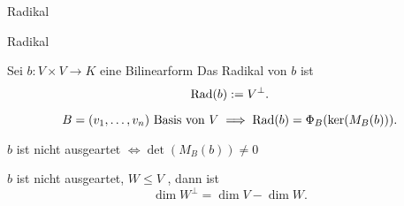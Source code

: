 \documentclass[class=article, crop=false]{standalone}
\begin{document}
\begin{zettel}{Radikal}

\begin{flashcard}[440yjl7c]{Radikal}
	\begin{definition}[Radikal]
		Sei $b: V \times V \to  K$ eine Bilinearform Das Radikal von $b$ ist
		\[
			\operatorname{Rad}(b) := V^\perp
		.\]
	\end{definition}
\end{flashcard}

\begin{theorem}
	\[
		B = ( v_1,\dots,v_n) \text{ Basis von } V \implies \operatorname{Rad}(b)= \Phi_{B} ( \ker(M_B (b)))
	.\]
\end{theorem}
\begin{corollary}
	$b$ ist nicht ausgeartet $\iff \det (M_B(b) ) \neq 0$
\end{corollary}
\begin{theorem}
	$b$ ist nicht ausgeartet, $W \leq V$ , dann ist
	\[
		\dim W^{\perp}= \dim V - \dim W
	.\]
\end{theorem}
\end{zettel}
\end{document}
